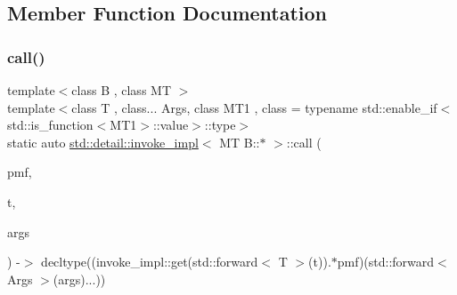 \subsection{Member Function Documentation}
\mbox{\label{structstd_1_1detail_1_1invoke__impl_3_01MT_01B_1_1_5_01_4_aac8b16a210add2424aa7556354b8d815}} 
\subsubsection{\texorpdfstring{call()}{call()}\hspace{0.1cm}{\footnotesize\ttfamily [1/2]}}
{\footnotesize\ttfamily template$<$class B , class MT $>$ \\
template$<$class T , class... Args, class M\+T1 , class  = typename std\+::enable\+\_\+if$<$std\+::is\+\_\+function$<$\+M\+T1$>$\+::value$>$\+::type$>$ \\
static auto \hyperlink{structstd_1_1detail_1_1invoke__impl}{std\+::detail\+::invoke\+\_\+impl}$<$ MT B\+::$\ast$ $>$\+::call (\begin{DoxyParamCaption}\item[{M\+T1 B\+::$\ast$}]{pmf,  }\item[{T \&\&}]{t,  }\item[{Args \&\&...}]{args }\end{DoxyParamCaption}) -\/$>$  decltype((invoke\+\_\+impl\+::get(std\+::forward$<$ T $>$(t)).$\ast$pmf)(std\+::forward$<$ Args $>$(args)...))\hspace{0.3cm}{\ttfamily [static]}}

\mbox{\label{structstd_1_1detail_1_1invoke__impl_3_01MT_01B_1_1_5_01_4_a8c451a7c858ae8dfd8fc34edf8edfe2a}} 
